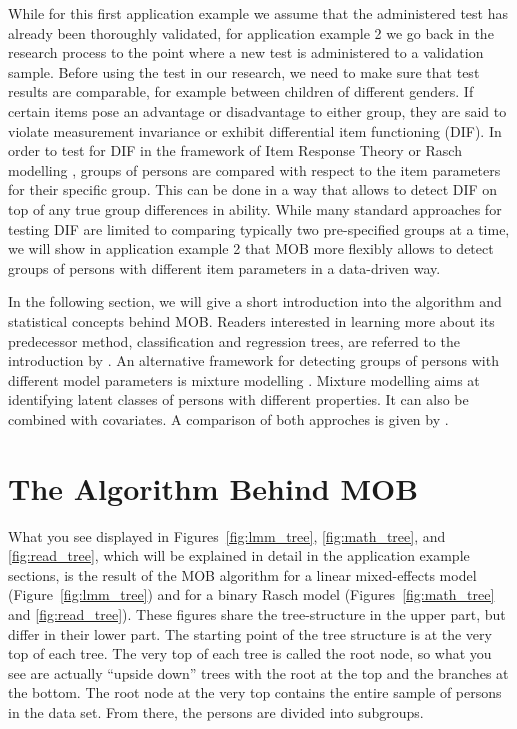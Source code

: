 \documentclass[doc,floatsintext,natbib]{apa7}
\begin{document}
While for this first application example we assume that the administered test  has already been thoroughly validated, for application example 2 we go back in the research process to the point where a new test is administered to a validation sample. Before using the test in our research, we need to make sure that test results are comparable, for example between children of different genders. If certain items pose an advantage or disadvantage to either group, they are said to violate measurement invariance or exhibit differential item functioning (DIF). In order to test for DIF in the framework of Item Response Theory or Rasch modelling \cite{AnthyDiPe16,DebStrZei:2022:CRC,Mall97}, groups of persons are compared with respect to the item parameters for their specific group. This can be done in a way that allows to detect DIF on top of any true group differences in ability. While many standard approaches for testing DIF are limited to comparing typically two pre-specified groups at a time, we will show in application example 2 that MOB more flexibly allows to detect groups of persons with different item parameters in a data-driven 
way. 

In the following section, we will give a short introduction into the algorithm and statistical concepts behind MOB. Readers interested in learning more about its predecessor method, classification and regression trees, are referred to the introduction by \citet{StrMalTut:2009:PM}. An alternative framework for detecting groups of persons with different model parameters is mixture modelling \citep[see, e.g.,][in the context of Rasch modelling]{AyalySant17,FriStrZei:2015:EaPM}. Mixture modelling aims at identifying latent classes of persons with different properties. It can also be combined with covariates. A comparison of both approches is given by \citet{FriStrZei:2014}.


\section{The Algorithm Behind MOB}

What you see displayed in Figures~\ref{fig:lmm_tree}, \ref{fig:math_tree}, and \ref{fig:read_tree}, which will be explained in detail in the application example sections, is the result of the MOB algorithm for a linear mixed-effects model (Figure~\ref{fig:lmm_tree}) and for a binary Rasch model (Figures~\ref{fig:math_tree} and \ref{fig:read_tree}). These figures share the tree-structure in the upper part, but differ in their lower part. The starting point of the tree structure is at the very top of each tree. The very top of each tree is called the root node, so what you see are actually ``upside down'' trees with the root at the top and the branches at the 
bottom. The root node at the very top contains the entire sample of persons in the data set. From there, the persons are divided into subgroups.
\end{document}
